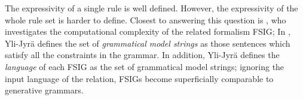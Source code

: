 The expressivity of a single rule is well defined. However, the expressivity of the whole rule set is harder to define. 
%
%
%
Closest to answering this question is 
\cite{yli-jyra2003describing,yli-jyra2004fsig_dependency} ,
who investigates the computational complexity of the related formalism FSIG; 
 In \cite{yli-jyra2005phd}, Yli-Jyrä defines the set of \emph{grammatical model strings} 
as those sentences which satisfy all the constraints in the grammar. In addition, Yli-Jyrä \cite{yli-jyra2005phd} defines the \emph{language} of each FSIG as the set of grammatical model strings; ignoring the input language of the relation, FSIGs become superficially comparable to generative grammars.

